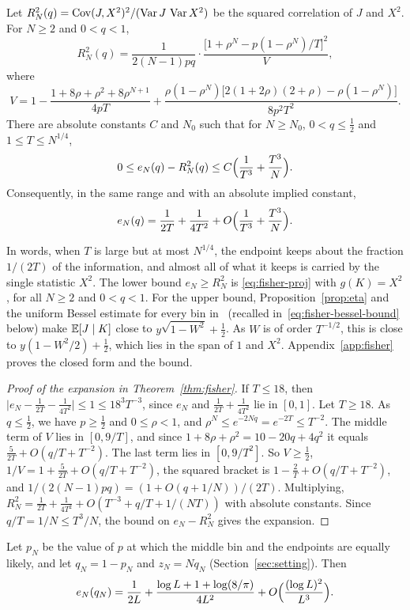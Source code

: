 \begin{theorem}\label{thm:fisher}
Let $R^2_N(q)=\operatorname{Cov}(J,X^2)^2/(\operatorname{Var} J\,\operatorname{Var} X^2)$ be the squared correlation
of $J$ and $X^2$. For $N\ge2$ and $0<q<1$,
\[
 R^2_N(q)=\frac1{2(N-1)pq}\cdot
 \frac{\bigl[1+\rho^N-p(1-\rho^N)/T\bigr]^2}{V},
\]
where
\[
 V=1-\frac{1+8\rho+\rho^2+8\rho^{N+1}}{4pT}
 +\frac{\rho(1-\rho^N)\bigl[2(1+2\rho)(2+\rho)-\rho(1-\rho^N)\bigr]}{8p^2T^2}.
\]
There are absolute constants $C$ and $N_0$ such that for $N\ge N_0$,
$0<q\le\frac12$ and $1\le T\le N^{1/4}$,
\[
 0\le e_N(q)-R^2_N(q)\le C\Bigl(\frac1{T^3}+\frac{T^3}N\Bigr).
\]
Consequently, in the same range and with an absolute implied constant,
\[
 e_N(q)=\frac1{2T}+\frac1{4T^2}+O\Bigl(\frac1{T^3}+\frac{T^3}N\Bigr).
\]
\end{theorem}

In words, when $T$ is large but at most $N^{1/4}$, the endpoint keeps about the
fraction $1/(2T)$ of the information, and almost all of what it keeps is carried
by the single statistic $X^2$. The lower bound $e_N\ge R^2_N$ is
\eqref{eq:fisher-proj} with $g(K)=X^2$,
for all $N\ge2$ and $0<q<1$. For the upper bound, Proposition~\ref{prop:eta}
and the uniform Bessel estimate for every bin in~\cite{paperA}
(recalled in~\eqref{eq:fisher-bessel-bound} below) make
$\mathbb E[J\mid K]$ close to $y\sqrt{1-W^2}+\frac12$. As $W$ is of order
$T^{-1/2}$, this is close to $y(1-W^2/2)+\frac12$, which lies in the span of
$1$ and $X^2$. Appendix~\ref{app:fisher} proves the closed form and the
bound.

\begin{proof}[Proof of the expansion in Theorem~\ref{thm:fisher}]
If $T\le18$, then $\lvert e_N-\frac1{2T}-\frac1{4T^2}\rvert\le1\le18^3T^{-3}$,
since $e_N$ and $\frac1{2T}+\frac1{4T^2}$ lie in $[0,1]$. Let $T\ge18$. As $q\le\frac12$, we have $p\ge\frac12$
and $0\le\rho<1$, and $\rho^N\le e^{-2Nq}=e^{-2T}\le T^{-2}$. The middle term of $V$ lies
in $[0,9/T]$, and since $1+8\rho+\rho^2=10-20q+4q^2$ it equals
$\frac5{2T}+O(q/T+T^{-2})$. The last term lies in $[0,9/T^2]$. So
$V\ge\frac12$, $1/V=1+\frac5{2T}+O(q/T+T^{-2})$, the squared bracket is
$1-\frac2T+O(q/T+T^{-2})$, and $1/(2(N-1)pq)=(1+O(q+1/N))/(2T)$. Multiplying,
$R^2_N=\frac1{2T}+\frac1{4T^2}+O(T^{-3}+q/T+1/(NT))$ with absolute
constants. Since $q/T=1/N\le T^3/N$, the bound on $e_N-R^2_N$ gives the
expansion.
\end{proof}

\begin{corollary}\label{cor:fisher-crossing}
Let $p_N$ be the value of $p$ at which the middle bin and the endpoints are
equally likely, and let $q_N=1-p_N$ and $z_N=Nq_N$
(Section~\ref{sec:setting}). Then
\[
 e_N(q_N)=\frac1{2L}+\frac{\log L+1+\log(8/\pi)}{4L^2}
 +O\Bigl(\frac{(\log L)^2}{L^3}\Bigr).
\]
\end{corollary}


